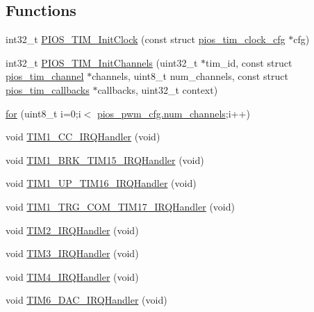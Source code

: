 \subsection*{\-Functions}
\begin{DoxyCompactItemize}
\item 
int32\-\_\-t \hyperlink{group___p_i_o_s___t_i_m_ga091c161ba7b19b91067616f0cbd768fc}{\-P\-I\-O\-S\-\_\-\-T\-I\-M\-\_\-\-Init\-Clock} (const struct \hyperlink{structpios__tim__clock__cfg}{pios\-\_\-tim\-\_\-clock\-\_\-cfg} $\ast$cfg)
\item 
int32\-\_\-t \hyperlink{group___p_i_o_s___t_i_m_ga7f5717527aad92ccdff6c7a1841754f7}{\-P\-I\-O\-S\-\_\-\-T\-I\-M\-\_\-\-Init\-Channels} (uint32\-\_\-t $\ast$tim\-\_\-id, const struct \hyperlink{structpios__tim__channel}{pios\-\_\-tim\-\_\-channel} $\ast$channels, uint8\-\_\-t num\-\_\-channels, const struct \hyperlink{structpios__tim__callbacks}{pios\-\_\-tim\-\_\-callbacks} $\ast$callbacks, uint32\-\_\-t context)
\item 
\hyperlink{group___p_i_o_s___t_i_m_ga354d20ebcb9396fb9b160590fcef9cee}{for} (uint8\-\_\-t i=0;i$<$ \hyperlink{structpios__pwm__cfg_acf9d41bfa9ce5ee489fcb27a98605e5c}{pios\-\_\-pwm\-\_\-cfg.\-num\-\_\-channels};i++)
\item 
void \hyperlink{group___p_i_o_s___t_i_m_gae8a61b27afdb07c70d6b863c44284ca6}{\-T\-I\-M1\-\_\-\-C\-C\-\_\-\-I\-R\-Q\-Handler} (void)
\item 
void \hyperlink{group___p_i_o_s___t_i_m_ga37c3c8d5fe4f0106410dea2c1147b8a9}{\-T\-I\-M1\-\_\-\-B\-R\-K\-\_\-\-T\-I\-M15\-\_\-\-I\-R\-Q\-Handler} (void)
\item 
void \hyperlink{group___p_i_o_s___t_i_m_gab19e96bc9fe4483b9fdf25047c61238e}{\-T\-I\-M1\-\_\-\-U\-P\-\_\-\-T\-I\-M16\-\_\-\-I\-R\-Q\-Handler} (void)
\item 
void \hyperlink{group___p_i_o_s___t_i_m_gaa96795d8fb4793f60135fad74ecb1d70}{\-T\-I\-M1\-\_\-\-T\-R\-G\-\_\-\-C\-O\-M\-\_\-\-T\-I\-M17\-\_\-\-I\-R\-Q\-Handler} (void)
\item 
void \hyperlink{group___p_i_o_s___t_i_m_ga38ad4725462bdc5e86c4ead4f04b9fc2}{\-T\-I\-M2\-\_\-\-I\-R\-Q\-Handler} (void)
\item 
void \hyperlink{group___p_i_o_s___t_i_m_gac8e51d2183b5230cbd5481f8867adce9}{\-T\-I\-M3\-\_\-\-I\-R\-Q\-Handler} (void)
\item 
void \hyperlink{group___p_i_o_s___t_i_m_ga7133f3f78767503641d307386e68bd28}{\-T\-I\-M4\-\_\-\-I\-R\-Q\-Handler} (void)
\item 
void \hyperlink{group___p_i_o_s___t_i_m_ga0839a45f331c4c067939b9c4533bbf4d}{\-T\-I\-M6\-\_\-\-D\-A\-C\-\_\-\-I\-R\-Q\-Handler} (void)

\end{DoxyCompactItemize}
